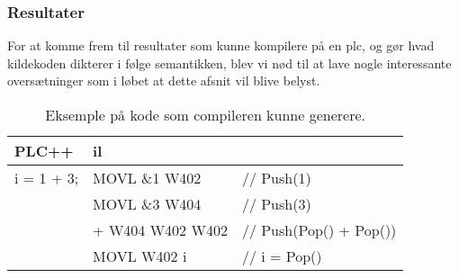 \subsubsection{Resultater}
For at komme frem til resultater som kunne kompilere på en \gls{plc}, og gør hvad kildekoden dikterer i følge semantikken, blev vi nød til at lave nogle interessante oversætninger som i løbet at dette afsnit vil blive belyst.

\begin{table}[H]
    \centering\ttfamily
    \begin{tabular}{l|l l}
        PLC++       & \gls{il} \\\hline
        i = 1 + 3;  & MOVL \&1 W402     &// Push(1)\\
                    & MOVL \&3 W404     &// Push(3)\\
                    & + W404 W402 W402  &// Push(Pop() + Pop())\\
                    & MOVL W402 i       &// i = Pop()
    \end{tabular}
    \caption{Eksemple på kode som compileren kunne generere.}
    \label{tab:codegenExample}
\end{table}

